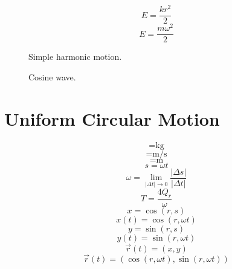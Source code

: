 \documentclass[a4paper,12pt]{report}
\begin{document}
\begin{equation}
E = \frac{kr^2}{2}
\end{equation}
\begin{equation}
E = \frac{m \omega^2}{2}
\end{equation}
\clearpage
\begin{figure}[p]
\centering
\resizebox{\textwidth}{!}{}
\caption{Simple harmonic motion.}
\end{figure}
\clearpage
\begin{figure}[p]
\centering
\resizebox{\textwidth}{!}{}
\caption{Cosine wave.}
\end{figure}
\clearpage
\section{Uniform Circular Motion}
\begin{equation}
[m] = \text{kg}
\end{equation}
\begin{equation}
[\omega] = \text{m/s}
\end{equation}
\begin{equation}
[r] = \text{m}
\end{equation}
\begin{equation}
s = \omega t
\end{equation}
\begin{equation}
\omega = \lim \limits_{\left|\Delta t\right| \to 0} \frac{\left|\Delta s\right|}{\left|\Delta t\right|}
\end{equation}
\begin{equation}
T = \frac{4Q_r}{\omega}
\end{equation}
\begin{equation}
x = \cos(r,s)
\end{equation}
\begin{equation}
x(t) = \cos(r,\omega t)
\end{equation}
\begin{equation}
y = \sin(r,s)
\end{equation}
\begin{equation}
y(t) = \sin(r,\omega t)
\end{equation}
\begin{equation}
\vec{r}(t) = (x,y)
\end{equation}
\begin{equation}
\vec{r}(t) = (\cos(r,\omega t),\sin(r,\omega t))
\end{equation}
\end{document}
